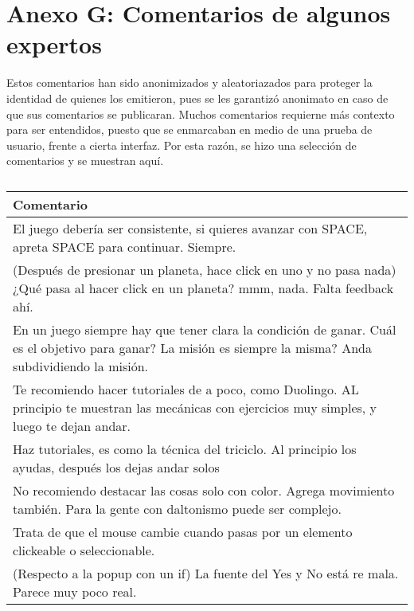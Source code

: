 \chapter*{Anexo G: Comentarios de algunos expertos}\label{AnexoG}

Estos comentarios han sido anonimizados y aleatoriazados para proteger la identidad de quienes los emitieron, pues se les garantizó anonimato en caso de que sus comentarios se publicaran.
Muchos comentarios requierne más contexto para ser entendidos, puesto que se enmarcaban en medio de una prueba de usuario, frente a cierta interfaz. Por esta razón, se hizo una selección de comentarios y se muestran aquí.



\begin{table}[h]
   \centering
   \caption*{\textit{ }}
   \begin{tabular}{|p{\linewidth}|}
   \hline
   \textbf{Comentario} \\\hline
   El juego debería ser consistente, si quieres avanzar con SPACE, apreta SPACE para continuar. Siempre. \\\hline
   (Después de presionar un planeta, hace click en uno y no pasa nada) ¿Qué pasa al hacer click en un planeta? mmm, nada. Falta feedback ahí. \\\hline
   
   En un juego siempre hay que tener clara la condición de ganar.
   Cuál es el objetivo para ganar? La misión es siempre la misma? Anda subdividiendo la misión. \\\hline

   Te recomiendo hacer tutoriales de a poco, como Duolingo. AL principio te muestran las mecánicas con ejercicios muy simples, y luego te dejan andar. \\\hline

   Haz tutoriales, es como la técnica del triciclo. Al principio los ayudas, después los dejas andar solos \\\hline

   No recomiendo destacar las cosas solo con color. Agrega movimiento también. Para la gente con daltonismo puede ser complejo. \\\hline

   Trata de que el mouse cambie cuando pasas por un elemento clickeable o seleccionable. \\\hline

   (Respecto a la popup con un if) La fuente del Yes y No está re mala. Parece muy poco real. \\\hline


\end{tabular}
\end{table}
